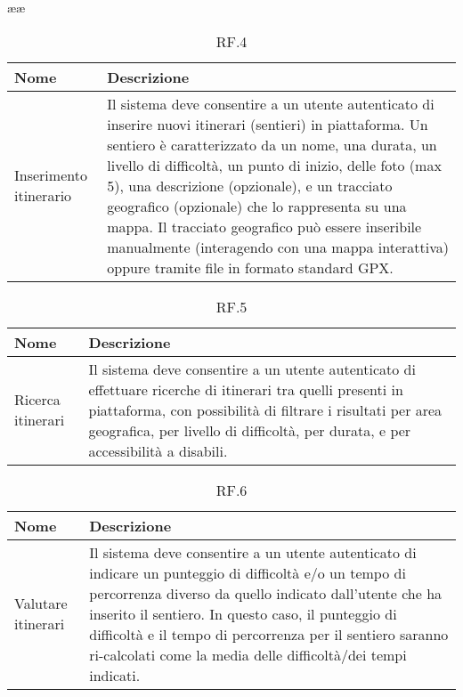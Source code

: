 ææ\documentclass{natourDoc}
\begin{document}
	\begin{table}[H]
		\centering
		\begin{tabular}{ |p{5cm}|p{10.3cm}| } 
			\hline
			\rowcolor{PineGreen!70}
			\textbf{Nome} & \textbf{Descrizione} \\
			\hline
			Inserimento itinerario &  Il sistema deve consentire a un utente autenticato di inserire nuovi itinerari (sentieri) in piattaforma. Un sentiero è
			caratterizzato da un nome, una durata, un livello di difficoltà, un punto di inizio, delle foto (max 5), una descrizione
			(opzionale), e un tracciato geografico (opzionale) che lo rappresenta su una mappa. Il tracciato
			geografico può essere inseribile manualmente (interagendo con una mappa interattiva) oppure
			tramite file in formato standard GPX.\\ 
			\hline
		\end{tabular}
		\caption{RF.4}
		\label{table:4}
	\end{table}
	
	\begin{table}[H]
		\centering
		\begin{tabular}{ |p{5cm}|p{10.3cm}| } 
			\hline
			\rowcolor{PineGreen!70}
			\textbf{Nome} & \textbf{Descrizione} \\
			\hline
			Ricerca itinerari &  Il sistema deve consentire a un utente autenticato di effettuare ricerche di itinerari tra quelli presenti in piattaforma, con possibilità di filtrare i risultati
			per area geografica, per livello di difficoltà, per durata, e per accessibilità a disabili.\\ 
			\hline
		\end{tabular}
		\caption{RF.5}
		\label{table:5}
	\end{table}
	
	\begin{table}[H]
		\centering
		\begin{tabular}{ |p{5cm}|p{10.3cm}| } 
			\hline
			\rowcolor{PineGreen!70}
			\textbf{Nome} & \textbf{Descrizione} \\
			\hline
			Valutare itinerari & Il sistema deve consentire a un utente autenticato di indicare un punteggio di difficoltà e/o un tempo
			di percorrenza diverso da quello indicato dall’utente che ha inserito il sentiero. In questo caso, il
			punteggio di difficoltà e il tempo di percorrenza per il sentiero saranno ri-calcolati come la media
			delle difficoltà/dei tempi indicati.\\ 
			\hline
		\end{tabular}
		\caption{RF.6}
		\label{table:6}
	\end{table}
	
\end{document}
